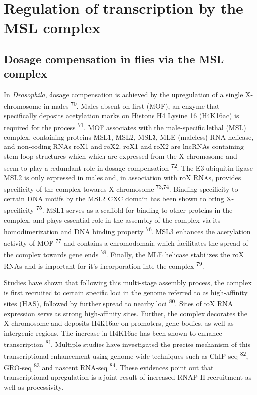 \documentclass[11pt,twoside]{MPIthesis}
\theoremstyle{definition}
\theoremstyle{definition}
\theoremstyle{definition}
\theoremstyle{remark}
\begin{document}
\section{Regulation of transcription by the MSL
complex}\label{regulation-of-transcription-by-the-msl-complex}

\subsection{Dosage compensation in flies via the MSL
complex}\label{dosage-compensation-in-flies-via-the-msl-complex}

In \emph{Drosophila}, dosage compensation is achieved by the
upregulation of a single X-chromosome in males \textsuperscript{70}.
Males absent on first (MOF), an enzyme that specifically deposits
acetylation marks on Histone H4 Lysine 16 (H4K16ac) is required for the
process \textsuperscript{71}. MOF associates with the male-specific
lethal (MSL) complex, containing proteins MSL1, MSL2, MSL3, MLE
(maleless) RNA helicase, and non-coding RNAs roX1 and roX2. roX1 and
roX2 are lncRNAs containing stem-loop structures which which are
expressed from the X-chromosome and seem to play a redundant role in
dosage compensation \textsuperscript{72}. The E3 ubiquitin ligase MSL2
is only expressed in males and, in association with roX RNAs, provides
specificity of the complex towards X-chromosome \textsuperscript{73,74}.
Binding specificity to certain DNA motifs by the MSL2 CXC domain has
been shown to bring X-specificity \textsuperscript{75}. MSL1 serves as a
scaffold for binding to other proteins in the complex, and plays
essential role in the assembly of the complex via its homodimerization
and DNA binding property \textsuperscript{76}. MSL3 enhances the
acetylation activity of MOF \textsuperscript{77} and contains a
chromodomain which facilitates the spread of the complex towards gene
ends \textsuperscript{78}. Finally, the MLE helicase stabilizes the roX
RNAs and is important for it's incorporation into the complex
\textsuperscript{79}.

Studies have shown that following this multi-stage assembly process, the
complex is first recruited to certain specific loci in the genome
referred to as high-affinity sites (HAS), followed by further spread to
nearby loci \textsuperscript{80}. Sites of roX RNA expression serve as
strong high-affinity sites. Further, the complex decorates the
X-chromosome and deposits H4K16ac on promoters, gene bodies, as well as
intergenic regions. The increase in H4K16ac has been shown to enhance
transcription \textsuperscript{81}. Multiple studies have investigated
the precise mechanism of this transcriptional enhancement using
genome-wide techniques such as ChIP-seq \textsuperscript{82}, GRO-seq
\textsuperscript{83} and nascent RNA-seq \textsuperscript{84}. These
evidences point out that transcriptional upregulation is a joint result
of increased RNAP-II recruitment as well as processivity.
\end{document}
